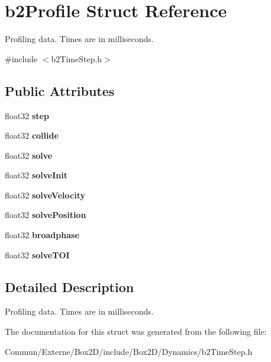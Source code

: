 \hypertarget{structb2_profile}{}\section{b2\+Profile Struct Reference}
\label{structb2_profile}


Profiling data. Times are in milliseconds.  




{\ttfamily \#include $<$b2\+Time\+Step.\+h$>$}

\subsection*{Public Attributes}
\begin{DoxyCompactItemize}
\item 
float32 {\bfseries step}\hypertarget{structb2_profile_a5b93de1d56902224868beacc478b9863}{}\label{structb2_profile_a5b93de1d56902224868beacc478b9863}

\item 
float32 {\bfseries collide}\hypertarget{structb2_profile_af827d9e54f7a4e94d0a023e18466b960}{}\label{structb2_profile_af827d9e54f7a4e94d0a023e18466b960}

\item 
float32 {\bfseries solve}\hypertarget{structb2_profile_afbefc05f05ec8bfd6cb2011929688a0b}{}\label{structb2_profile_afbefc05f05ec8bfd6cb2011929688a0b}

\item 
float32 {\bfseries solve\+Init}\hypertarget{structb2_profile_a010110900c27ccc88cd5e23b0e12e96e}{}\label{structb2_profile_a010110900c27ccc88cd5e23b0e12e96e}

\item 
float32 {\bfseries solve\+Velocity}\hypertarget{structb2_profile_ae4d29a19b38de81621bccdbf75595233}{}\label{structb2_profile_ae4d29a19b38de81621bccdbf75595233}

\item 
float32 {\bfseries solve\+Position}\hypertarget{structb2_profile_a78e22d104226863492ebab9ea30a9ed9}{}\label{structb2_profile_a78e22d104226863492ebab9ea30a9ed9}

\item 
float32 {\bfseries broadphase}\hypertarget{structb2_profile_a6bd556e43a6fa3853adad9fd71e56b44}{}\label{structb2_profile_a6bd556e43a6fa3853adad9fd71e56b44}

\item 
float32 {\bfseries solve\+T\+OI}\hypertarget{structb2_profile_a74e8ea0c6ca39250d639ec94b69a803e}{}\label{structb2_profile_a74e8ea0c6ca39250d639ec94b69a803e}

\end{DoxyCompactItemize}


\subsection{Detailed Description}
Profiling data. Times are in milliseconds. 

The documentation for this struct was generated from the following file\+:\begin{DoxyCompactItemize}
\item 
Commun/\+Externe/\+Box2\+D/include/\+Box2\+D/\+Dynamics/b2\+Time\+Step.\+h\end{DoxyCompactItemize}
